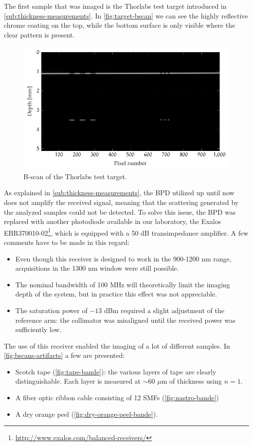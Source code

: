 \noindent The first sample that was imaged is the Thorlabs test target introduced in \autoref{sub:thickness-measurements}. In \autoref{fig:target-bscan} we can see the highly reflective chrome coating on the top, while the bottom surface is only visible where the clear pattern is present.
\begin{figure}[hbt]
	\centering
	\includegraphics[width=0.8\linewidth]{gfx/ch4/axsun/target-bscan}
	\caption{B-scan of the Thorlabs test target.}\label{fig:target-bscan}
\end{figure}%


As explained in \autoref{sub:thickness-measurements}, the BPD utilized up until now does not amplify the received signal, meaning that the scattering generated by the analyzed samples could not be detected. To solve this issue, the BPD was replaced with another photodiode available in our laboratory, the Exalos EBR370010-02\footnote{\url{http://www.exalos.com/balanced-receivers/}}, which is equipped with a 50 dB transimpedance amplifier. A few comments have to be made in this regard:
\begin{itemize}
	\item Even though this receiver is designed to work in the 900-1200 nm range, acquisitions in the 1300 nm window were still possible. 
	
	\item The nominal bandwidth of 100 MHz will theoretically limit the imaging depth of the system, but in practice this effect was not appreciable. 
	
	\item The saturation power of $-13$ dBm required a slight adjustment of the reference arm: the collimator was misaligned until the received power was sufficiently low. 
\end{itemize}

The use of this receiver enabled the imaging of a lot of different samples. In \autoref{fig:bscans-artifacts} a few are presented:
\begin{itemize}
	\item Scotch tape (\autoref{fig:tape-bande}): the various layers of tape are clearly distinguishable. Each layer is measured at $\sim 60$ $\mu$m of thickness using $n=1$. 
		\item A fiber optic ribbon cable consisting of 12 \acp{SMF} (\autoref{fig:nastro-bande})
		
	\item A dry orange peel (\autoref{fig:dry-orange-peel-bande}). 
	
	
\end{itemize} 

